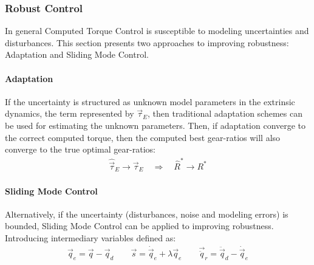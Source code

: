 \subsubsection{Robust Control}
\label{sec:robustcontrol}

In general Computed Torque Control is susceptible to modeling uncertainties and disturbances. This section presents two approaches to improving robustness: Adaptation and Sliding Mode Control. 

\paragraph{Adaptation}
If the uncertainty is structured as unknown model parameters in the extrinsic dynamics, the term represented by $\vec{\tau}_E$, then traditional adaptation schemes can be used for estimating the unknown parameters. Then, if adaptation converge to the correct computed torque, then the computed best gear-ratios will also converge to the true optimal gear-ratios:
\begin{align}
	\hat{\vec{\tau}}_E \rightarrow \vec{\tau}_E 
    \quad \Rightarrow \quad 
    \hat{R}^* \rightarrow R^*
 \label{eq:adapt}
\end{align}

\paragraph{Sliding Mode Control}

Alternatively, if the uncertainty (disturbances, noise and modeling errors) is bounded, Sliding Mode Control can be applied to improving robustness. %
Introducing intermediary variables defined as:
\begin{align}
	\vec{q}_e        = \vec{q} - \vec{q}_d  \quad \quad
	\vec{s}          = \dot{\vec{q}}_e + \lambda \vec{q}_e \quad \quad
  \vec{\ddot{q}}_r = \ddot{\vec{q}}_d - \dot{\vec{q}}_e
 \label{eq:slidingvar}
\end{align}

